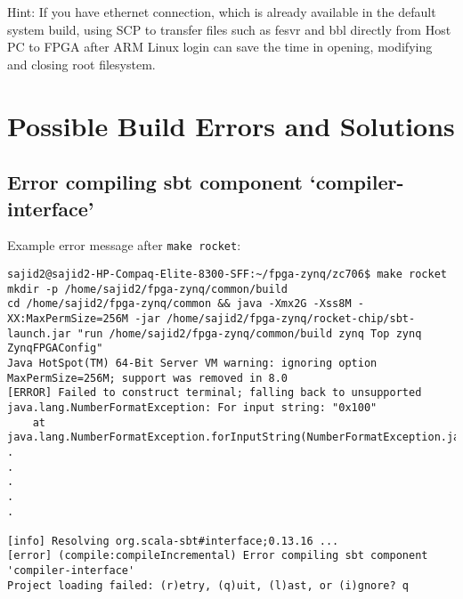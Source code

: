 \documentclass[a4paper,11pt]{article}
\begin{document}
Hint: If you have ethernet connection, which is already available in the default system build, using SCP to transfer files such as fesvr and bbl directly from Host PC to FPGA after ARM Linux login can save the time in opening, modifying and closing root filesystem.

\section{Possible Build Errors and Solutions}
\subsection{Error compiling sbt component  `compiler-interface'}
Example error message after {\tt make rocket}:
\begin{lstlisting}
sajid2@sajid2-HP-Compaq-Elite-8300-SFF:~/fpga-zynq/zc706$ make rocket
mkdir -p /home/sajid2/fpga-zynq/common/build
cd /home/sajid2/fpga-zynq/common && java -Xmx2G -Xss8M -XX:MaxPermSize=256M -jar /home/sajid2/fpga-zynq/rocket-chip/sbt-launch.jar "run /home/sajid2/fpga-zynq/common/build zynq Top zynq ZynqFPGAConfig"
Java HotSpot(TM) 64-Bit Server VM warning: ignoring option MaxPermSize=256M; support was removed in 8.0
[ERROR] Failed to construct terminal; falling back to unsupported
java.lang.NumberFormatException: For input string: "0x100"
	at java.lang.NumberFormatException.forInputString(NumberFormatException.java:65)
.
.
.
.
.

[info] Resolving org.scala-sbt#interface;0.13.16 ...
[error] (compile:compileIncremental) Error compiling sbt component 'compiler-interface'
Project loading failed: (r)etry, (q)uit, (l)ast, or (i)gnore? q
\end{lstlisting}
\end{document}
